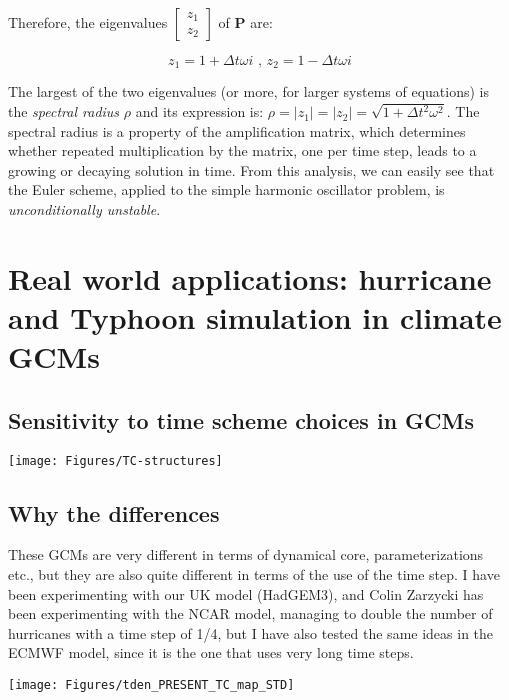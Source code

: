 Therefore, the eigenvalues $\left[\begin{array}{l}
	z_1 \\
	z_2
\end{array}\right]$ of $\mathbf{P}$ are:

\begin{equation}
z_1=1+\Delta t \omega i \text{ , } z_2=1-\Delta t \omega i
\end{equation}

The largest of the two eigenvalues (or more, for larger systems of equations) is the \emph{spectral radius} $\rho$ and its expression is: $\rho=\left|z_1\right|=\left|z_2\right|=\sqrt{1+\Delta t^2 \omega^2}$. The spectral radius is a property of the amplification matrix, which determines whether repeated multiplication by the matrix, one per time step, leads to a growing or decaying solution in time. From this analysis, we can easily see that the Euler scheme, applied to the simple harmonic oscillator problem, is \emph{unconditionally unstable}. 


\section{Real world applications: hurricane and Typhoon simulation in climate GCMs}

\subsection{Sensitivity to time scheme choices in GCMs}

\begin{center}	
	\texttt{[image: Figures/TC-structures]}
\end{center}

\subsection{Why the differences}
These GCMs are very different in terms of dynamical core, parameterizations etc., but they are also quite different in terms of the use of the time step. I have been experimenting with our UK model (HadGEM3), and Colin Zarzycki has been experimenting with the NCAR model, managing to double the number of hurricanes with a time step of 1/4, but I have also tested the same ideas in the ECMWF model, since it is the one that uses very long time steps.
\begin{center}	
	\texttt{[image: Figures/tden\_PRESENT\_TC\_map\_STD]}
\end{center}